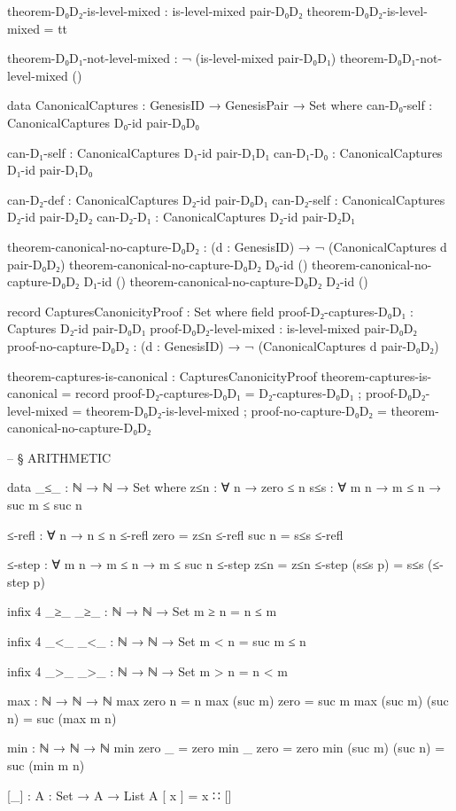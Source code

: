 \documentclass[11pt,a4paper]{book}
\begin{document}
\begin{code}
theorem-D₀D₂-is-level-mixed : is-level-mixed pair-D₀D₂
theorem-D₀D₂-is-level-mixed = tt

theorem-D₀D₁-not-level-mixed : ¬ (is-level-mixed pair-D₀D₁)
theorem-D₀D₁-not-level-mixed ()

data CanonicalCaptures : GenesisID → GenesisPair → Set where
  can-D₀-self : CanonicalCaptures D₀-id pair-D₀D₀
  
  can-D₁-self : CanonicalCaptures D₁-id pair-D₁D₁
  can-D₁-D₀   : CanonicalCaptures D₁-id pair-D₁D₀
  
  can-D₂-def  : CanonicalCaptures D₂-id pair-D₀D₁
  can-D₂-self : CanonicalCaptures D₂-id pair-D₂D₂
  can-D₂-D₁   : CanonicalCaptures D₂-id pair-D₂D₁

theorem-canonical-no-capture-D₀D₂ : (d : GenesisID) → ¬ (CanonicalCaptures d pair-D₀D₂)
theorem-canonical-no-capture-D₀D₂ D₀-id ()
theorem-canonical-no-capture-D₀D₂ D₁-id ()
theorem-canonical-no-capture-D₀D₂ D₂-id ()

record CapturesCanonicityProof : Set where
  field
    proof-D₂-captures-D₀D₁ : Captures D₂-id pair-D₀D₁
    proof-D₀D₂-level-mixed : is-level-mixed pair-D₀D₂
    proof-no-capture-D₀D₂  : (d : GenesisID) → ¬ (CanonicalCaptures d pair-D₀D₂)

theorem-captures-is-canonical : CapturesCanonicityProof
theorem-captures-is-canonical = record
  { proof-D₂-captures-D₀D₁ = D₂-captures-D₀D₁
  ; proof-D₀D₂-level-mixed = theorem-D₀D₂-is-level-mixed
  ; proof-no-capture-D₀D₂ = theorem-canonical-no-capture-D₀D₂
  }


-- § ARITHMETIC

data _≤_ : ℕ → ℕ → Set where
  z≤n : ∀ {n} → zero ≤ n
  s≤s : ∀ {m n} → m ≤ n → suc m ≤ suc n

≤-refl : ∀ {n} → n ≤ n
≤-refl {zero}  = z≤n
≤-refl {suc n} = s≤s ≤-refl

≤-step : ∀ {m n} → m ≤ n → m ≤ suc n
≤-step z≤n = z≤n
≤-step (s≤s p) = s≤s (≤-step p)

infix 4 _≥_
_≥_ : ℕ → ℕ → Set
m ≥ n = n ≤ m

infix 4 _<_
_<_ : ℕ → ℕ → Set
m < n = suc m ≤ n

infix 4 _>_
_>_ : ℕ → ℕ → Set
m > n = n < m

max : ℕ → ℕ → ℕ
max zero  n     = n
max (suc m) zero  = suc m
max (suc m) (suc n) = suc (max m n)

min : ℕ → ℕ → ℕ
min zero  _     = zero
min _     zero  = zero
min (suc m) (suc n) = suc (min m n)

[_] : {A : Set} → A → List A
[ x ] = x ∷ []


\end{code}
\end{document}
